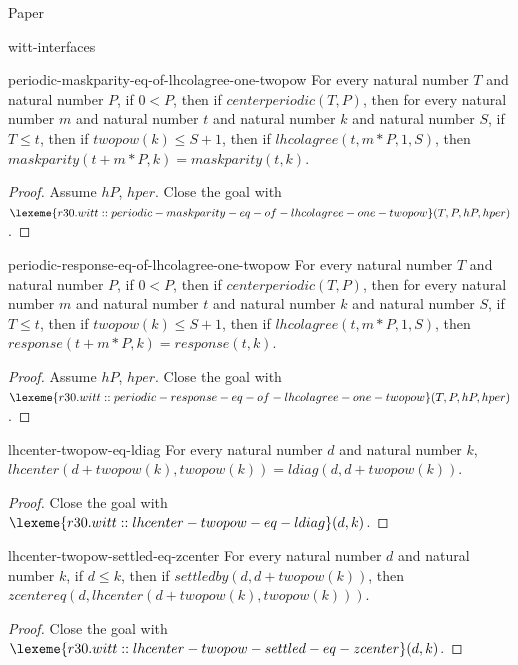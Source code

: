 \begin{lexlean}{Paper}
\begin{section}{witt-interfaces}
  \begin{theorem}{periodic-maskparity-eq-of-lhcolagree-one-twopow}
  For every natural number \(T\) and natural number \(P\), if \(0 < P\), then if \(centerperiodic(T, P)\), then for every natural number \(m\) and natural number \(t\) and natural number \(k\) and natural number \(S\), if \(T ≤ t\), then if \(twopow(k) ≤ S + 1\), then if \(lhcolagree(t, m * P, 1, S)\), then \(maskparity(t + m * P, k) = maskparity(t, k)\).
  \begin{proof}
  Assume \(hP\), \(hper\).
  Close the goal with \(\lexeme{r30.witt::periodic-maskparity-eq-of-lhcolagree-one-twopow}(T, P, hP, hper)\).
  \end{proof}
  \end{theorem}

  \begin{theorem}{periodic-response-eq-of-lhcolagree-one-twopow}
  For every natural number \(T\) and natural number \(P\), if \(0 < P\), then if \(centerperiodic(T, P)\), then for every natural number \(m\) and natural number \(t\) and natural number \(k\) and natural number \(S\), if \(T ≤ t\), then if \(twopow(k) ≤ S + 1\), then if \(lhcolagree(t, m * P, 1, S)\), then \(response(t + m * P, k) = response(t, k)\).
  \begin{proof}
  Assume \(hP\), \(hper\).
  Close the goal with \(\lexeme{r30.witt::periodic-response-eq-of-lhcolagree-one-twopow}(T, P, hP, hper)\).
  \end{proof}
  \end{theorem}

  \begin{theorem}{lhcenter-twopow-eq-ldiag}
  For every natural number \(d\) and natural number \(k\), \(lhcenter(d + twopow(k), twopow(k)) = ldiag(d, d + twopow(k))\).
  \begin{proof}
  Close the goal with \(\lexeme{r30.witt::lhcenter-twopow-eq-ldiag}(d, k)\).
  \end{proof}
  \end{theorem}

  \begin{theorem}{lhcenter-twopow-settled-eq-zcenter}
  For every natural number \(d\) and natural number \(k\), if \(d ≤ k\), then if \(settledby(d, d + twopow(k))\), then \(zcentereq(d, lhcenter(d + twopow(k), twopow(k)))\).
  \begin{proof}
  Close the goal with \(\lexeme{r30.witt::lhcenter-twopow-settled-eq-zcenter}(d, k)\).
  \end{proof}
  \end{theorem}


\end{section}
\end{lexlean}
